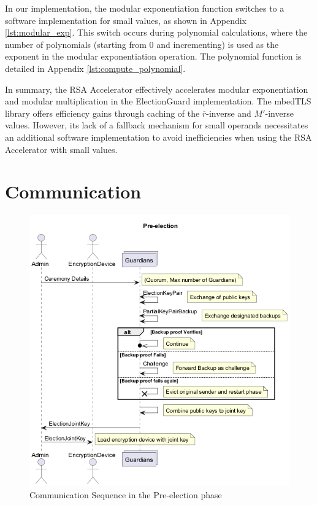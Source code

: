 In our implementation, the modular exponentiation function switches to a software implementation for small values, as shown in Appendix \ref{lst:modular_exp}. This switch occurs during polynomial calculations, where the number of polynomials (starting from 0 and incrementing) is used as the exponent in the modular exponentiation operation. The polynomial function is detailed in Appendix \ref{lst:compute_polynomial}.

In summary, the RSA Accelerator effectively accelerates modular exponentiation and modular multiplication in the ElectionGuard implementation. The mbedTLS library offers efficiency gains through caching of the \( \overline{r} \)-inverse and \( M' \)-inverse values. However, its lack of a fallback mechanism for small operands necessitates an additional software implementation to avoid inefficiencies when using the RSA Accelerator with small values.

\section{Communication}
\begin{figure}
    \centering
    \includegraphics[width=\textwidth]{abbildungen/Diagramme/communication-seq0.png}
    \caption{Communication Sequence in the Pre-election phase}
    \label{Fig:comm-pre}
\end{figure}

